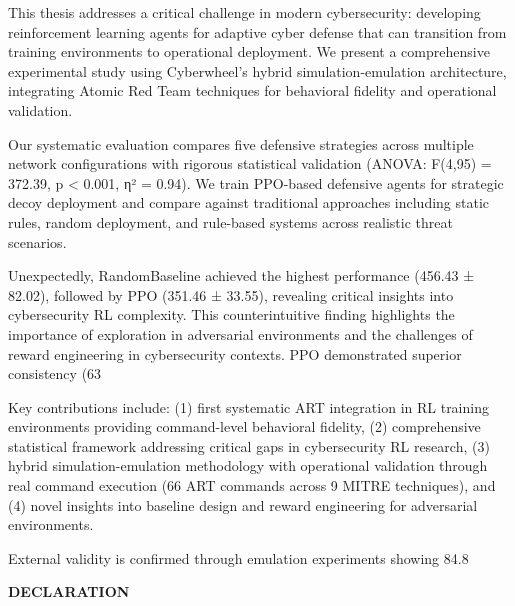 \documentclass[12pt]{article}
\theoremstyle{definition}
\theoremstyle{plain}
\begin{document}
\vspace{1em} %

This thesis addresses a critical challenge in modern cybersecurity: developing reinforcement learning agents for adaptive cyber defense that can transition from training environments to operational deployment. We present a comprehensive experimental study using Cyberwheel's hybrid simulation-emulation architecture, integrating Atomic Red Team techniques for behavioral fidelity and operational validation.

Our systematic evaluation compares five defensive strategies across multiple network configurations with rigorous statistical validation (ANOVA: F(4,95) = 372.39, p < 0.001, η² = 0.94). We train PPO-based defensive agents \citep{schulman2017proximal} for strategic decoy deployment and compare against traditional approaches including static rules, random deployment, and rule-based systems across realistic threat scenarios.

Unexpectedly, RandomBaseline achieved the highest performance (456.43 ± 82.02), followed by PPO (351.46 ± 33.55), revealing critical insights into cybersecurity RL complexity. This counterintuitive finding highlights the importance of exploration in adversarial environments and the challenges of reward engineering in cybersecurity contexts. PPO demonstrated superior consistency (63%

Key contributions include: (1) first systematic ART integration in RL training environments providing command-level behavioral fidelity, (2) comprehensive statistical framework addressing critical gaps in cybersecurity RL research, (3) hybrid simulation-emulation methodology with operational validation through real command execution (66 ART commands across 9 MITRE techniques), and (4) novel insights into baseline design and reward engineering for adversarial environments.

External validity is confirmed through emulation experiments showing 84.8%

\begin{center}
\large\textbf{DECLARATION}
\end{center}
\end{document}
